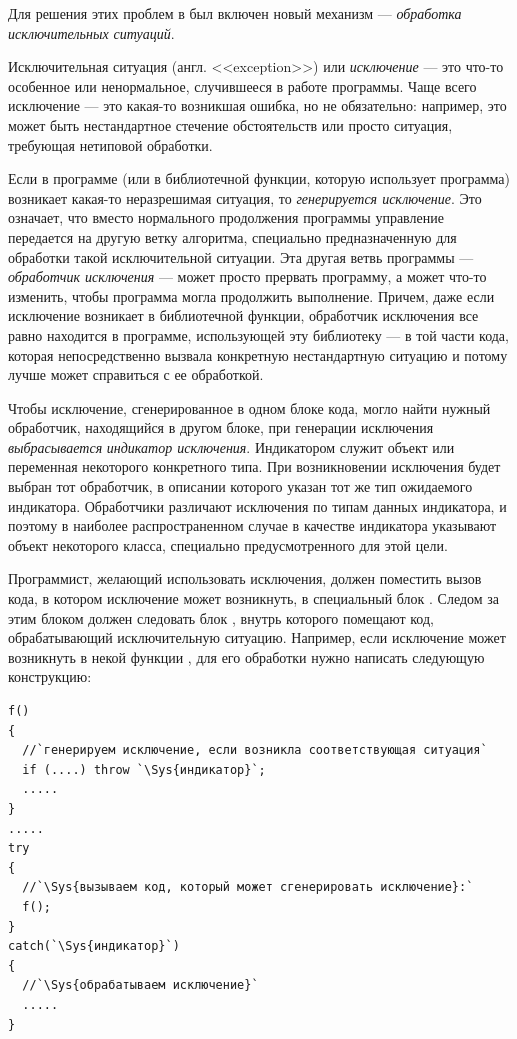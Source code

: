 Для решения этих проблем в  был включен новый механизм --- \emph{обработка исключительных ситуаций}.

Исключительная ситуация (англ. <<exception>>) или \emph{исключение} --- это что-то особенное
или ненормальное, случившееся в работе программы. Чаще всего исключение --- это какая-то возникшая ошибка, но не
обязательно: например, это может быть нестандартное стечение обстоятельств или просто ситуация, требующая нетиповой
обработки.

Если в программе (или в библиотечной функции, которую использует программа) возникает какая-то неразрешимая ситуация, то
\emph{генерируется исключение}. Это означает, что вместо нормального продолжения программы
управление передается на другую ветку алгоритма, специально предназначенную для обработки такой исключительной
ситуации. Эта другая ветвь программы --- \emph{обработчик исключения}
--- может просто прервать программу, а может что-то изменить, чтобы программа могла продолжить выполнение. Причем, даже
если исключение возникает в библиотечной функции,  обработчик исключения все равно находится в программе, использующей
эту библиотеку --- в той части кода,  которая непосредственно вызвала конкретную нестандартную ситуацию и потому лучше
может справиться с ее обработкой.

Чтобы исключение, сгенерированное в одном блоке кода, могло найти нужный обработчик, находящийся в другом блоке, при
генерации исключения \emph{выбрасывается}
 \emph{индикатор исключения}. Индикатором служит объект или переменная
некоторого конкретного типа. При возникновении исключения будет выбран тот обработчик, в описании которого указан тот
же тип ожидаемого индикатора. Обработчики различают исключения по типам данных индикатора, и поэтому в наиболее
распространенном случае в качестве индикатора указывают объект некоторого класса, специально предусмотренного для этой
цели.

Программист, желающий использовать исключения, должен поместить вызов кода, в котором исключение может возникнуть, в
специальный блок . Следом за этим блоком должен следовать блок
, внутрь которого помещают код, обрабатывающий исключительную ситуацию. Например, если
исключение может возникнуть в некой функции , для его обработки нужно написать следующую
конструкцию:
\begin{lstlisting}
f() 
{
  //`генерируем исключение, если возникла соответствующая ситуация`
  if (....) throw `\Sys{индикатор}`;
  .....
}	
.....
try 
{
  //`\Sys{вызываем код, который может сгенерировать исключение}:`
  f();
}
catch(`\Sys{индикатор}`) 
{
  //`\Sys{обрабатываем исключение}`
  .....
}
\end{lstlisting}

